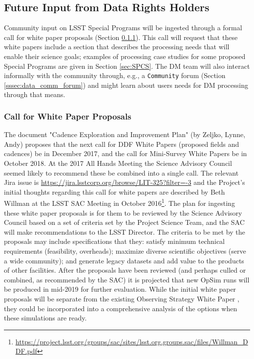 \documentclass[DM,lsstdraft,toc]{lsstdoc}
\begin{document}
\subsection{Future Input from Data Rights Holders} \label{ssec:data_comm}

Community input on LSST Special Programs will be ingested through a formal call for white paper proposals (Section \ref{sssec:data_comm_call}). This call will request that these white papers include a section that describes the processing needs that will enable their science goals; examples of processing case studies for some proposed Special Programs are given in Section \ref{sec:SPCS}. The DM team will also interact informally with the community through, e.g., a {\tt \Large{Community}} forum (Section \ref{sssec:data_comm_forum}) and might learn about users needs for DM processing through that means.

\subsubsection{Call for White Paper Proposals}\label{sssec:data_comm_call}

The document "Cadence Exploration and Improvement Plan" (by Zeljko, Lynne, Andy) proposes that the next call for DDF White Papers (proposed fields and cadences) be in December 2017, and the call for Mini-Survey White Papers be in October 2018. At the 2017 All Hands Meeting the Science Advisory Council seemed likely to recommend these be combined into a single call. The relevant Jira issue is \url{https://jira.lsstcorp.org/browse/LIT-325?filter=-3} and the Project's initial thoughts regarding this call for white papers are described by Beth Willman at the LSST SAC Meeting in October 2016\footnote{\url{https://project.lsst.org/groups/sac/sites/lsst.org.groups.sac/files/Willman_DDF.pdf}}. The plan for ingesting these white paper proposals is for them to be reviewed by the Science Advisory Council based on a set of criteria set by the Project Science Team, and the SAC will make recommendations to the LSST Director. The criteria to be met by the proposals may include specifications that they: satisfy minimum technical requirements (feasibility, overheads); maximize diverse scientific objectives (serve a wide community); and generate legacy datasets and add value to the products of other facilities. After the proposals have been reviewed (and perhaps culled or combined, as recommended by the SAC) it is projected that new OpSim runs will be produced in mid-2019 for further evaluation. While the initial white paper proposals will be separate from the existing Observing Strategy White Paper \cite{2017arXiv170804058L}, they could be incorporated into a comprehensive analysis of the options when these simulations are ready.
\end{document}
